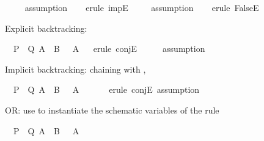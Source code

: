 \begin{isabellebody}
\ \ \ \isamarkupfalse%
\ assumption\isanewline
\ \ \isamarkupfalse%
\ {\isacharparenleft}{\kern0pt}erule\ impE{\isacharparenright}{\kern0pt}\isanewline
\ \ \ \isamarkupfalse%
\ assumption\isanewline
\ \ \isamarkupfalse%
\ {\isacharparenleft}{\kern0pt}erule\ FalseE{\isacharparenright}{\kern0pt}\isanewline
\ \ \isamarkupfalse%
%
\endisatagproof
{\isafoldproof}%
%
\isadelimproof
%
\endisadelimproof
%
\begin{isamarkuptext}%
Explicit backtracking:%
\end{isamarkuptext}\isamarkuptrue%
\isamarkupfalse%
\ {\isachardoublequoteopen}{\isasymlbrakk}\ P\ {\isasymand}\ Q{\isacharsemicolon}{\kern0pt}\ A\ {\isasymand}\ B\ {\isasymrbrakk}\ {\isasymLongrightarrow}\ A{\isachardoublequoteclose}\isanewline
%
\isadelimproof
\ \ %
\endisadelimproof
%
\isatagproof
{}\isamarkupfalse%
{\isacharparenleft}{\kern0pt}erule\ conjE{\isacharparenright}{\kern0pt}\isanewline
\ \ \isamarkupfalse%
\isanewline
\ \ \isamarkupfalse%
{\isacharparenleft}{\kern0pt}assumption{\isacharparenright}{\kern0pt}\isanewline
\ \ \isamarkupfalse%
%
\endisatagproof
{\isafoldproof}%
%
\isadelimproof
%
\endisadelimproof
%
\begin{isamarkuptext}%
Implicit backtracking: chaining with ,%
\end{isamarkuptext}\isamarkuptrue%
\isamarkupfalse%
\ {\isachardoublequoteopen}{\isasymlbrakk}\ P\ {\isasymand}\ Q{\isacharsemicolon}{\kern0pt}\ A\ {\isasymand}\ B\ {\isasymrbrakk}\ {\isasymLongrightarrow}\ A{\isachardoublequoteclose}\isanewline
\ \ \isanewline
%
\isadelimproof
\ \ %
\endisadelimproof
%
\isatagproof
{}\isamarkupfalse%
\ {\isacharparenleft}{\kern0pt}erule\ conjE{\isacharcomma}{\kern0pt}\ assumption{\isacharparenright}{\kern0pt}\isanewline
\ \ \isamarkupfalse%
%
\endisatagproof
{\isafoldproof}%
%
\isadelimproof
%
\endisadelimproof
%
\begin{isamarkuptext}%
OR: use  to instantiate the schematic variables of the rule%
\end{isamarkuptext}\isamarkuptrue%
\isamarkupfalse%
\ {\isachardoublequoteopen}{\isasymlbrakk}\ P\ {\isasymand}\ Q{\isacharsemicolon}{\kern0pt}\ A\ {\isasymand}\ B\ {\isasymrbrakk}\ {\isasymLongrightarrow}\ A{\isachardoublequoteclose}\isanewline

\end{isabellebody}
